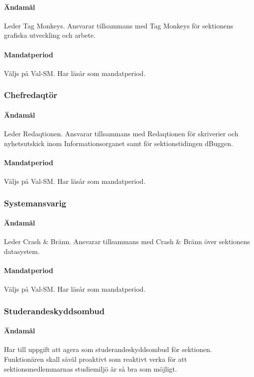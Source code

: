 \documentclass{dgovdoc}
\begin{document}
\paragraph{Ändamål}
Leder Tag Monkeys. Ansvarar tillsammans med Tag Monkeys för sektionens
grafiska utveckling och arbete.

\paragraph{Mandatperiod}

Väljs på Val-SM. Har läsår som mandatperiod.

\subsubsection{Chefredaqtör}

\paragraph{Ändamål}
Leder Redaqtionen. Ansvarar tillsammans med Redaqtionen för skriverier och
nyhetsutskick inom Informationsorganet samt för sektionstidingen dBuggen.

\paragraph{Mandatperiod}
Väljs på Val-SM. Har läsår som mandatperiod.

\subsubsection{Systemansvarig}

\paragraph{Ändamål}
Leder Crash & Bränn. Ansvarar tillsammans med Crash & Bränn över sektionens datasystem.

\paragraph{Mandatperiod}
Väljs på Val-SM. Har läsår som mandatperiod.

\subsubsection{Studerandeskyddsombud}

\paragraph{Ändamål}
Har till uppgift att agera som studerandeskyddsombud för sektionen. Funktionären skall såväl proaktivt som reaktivt verka för att sektionsmedlemmarnas studiemiljö är så bra som möjligt. 
\end{document}
